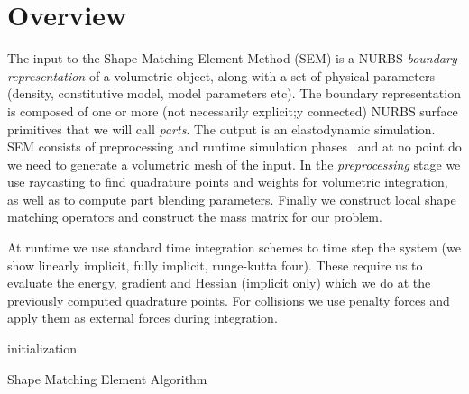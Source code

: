 
\section{Overview}
The input to the Shape Matching Element Method (SEM)  is a NURBS \emph{boundary representation} of a volumetric object, along with a set of physical parameters 
(density, constitutive model, model parameters etc). 
The boundary representation is composed of one or more (not necessarily explicit;y connected) NURBS surface primitives that we will call \emph{parts}.
The output is an elastodynamic simulation. 
SEM consists of preprocessing and runtime simulation phases~ and at no point do we need to generate a volumetric mesh of the input. 
In the \emph{preprocessing} stage we use raycasting to find quadrature points and weights for volumetric integration, as well as to compute part blending parameters. 
Finally we construct local shape matching operators and construct the mass matrix for our problem. 

At runtime we use standard time integration schemes to time step the system (we show linearly implicit, fully implicit, runge-kutta four). 
These require us to evaluate the energy, gradient and Hessian (implicit only) which we do at the previously computed quadrature points. 
For collisions we use penalty forces and apply them as external forces during integration.

\begin{algorithm}[h]
    \label{alg:sem}
    \SetAlgoLined
     initialization\;
     \caption{Shape Matching Element Algorithm}
    \end{algorithm}

